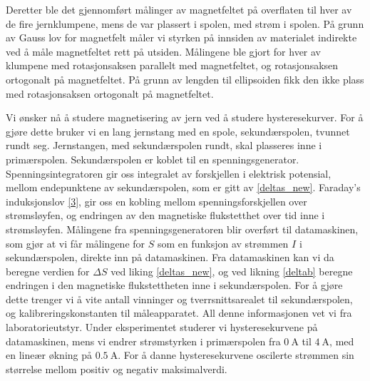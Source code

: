 \documentclass[%
 reprint,
 amsmath,amssymb,
 aps,
 norsk,
]{revtex4-1}
\begin{document}
Deretter ble det gjennomført målinger av magnetfeltet på overflaten til hver av de fire jernklumpene, mens de var plassert i spolen, med strøm i spolen. På grunn av Gauss lov for magnetfelt måler vi styrken på innsiden av materialet indirekte ved å måle magnetfeltet rett på utsiden. Målingene ble gjort for hver av klumpene med rotasjonsaksen parallelt med magnetfeltet, og rotasjonsaksen ortogonalt på magnetfeltet. På grunn av lengden til ellipsoiden fikk den ikke plass med rotasjonsaksen ortogonalt på magnetfeltet.
\par
Vi ønsker nå å studere magnetisering av jern ved å studere hysteresekurver. For å gjøre dette bruker vi en lang jernstang med en spole, sekundærspolen, tvunnet rundt seg. Jernstangen, med sekundærspolen rundt, skal plasseres inne i primærspolen. Sekundærspolen er koblet til en spenningsgenerator. Spenningsintegratoren gir oss integralet av forskjellen i elektrisk potensial, mellom endepunktene av sekundærspolen, som er gitt av \eqref{deltas_new}. Faraday's induksjonslov \eqref{3}, gir oss en kobling mellom spenningsforskjellen over strømsløyfen, og endringen av den magnetiske flukstetthet over tid inne i strømsløyfen. Målingene fra spenningsgeneratoren blir overført til datamaskinen, som gjør at vi får målingene for $S$ som en funksjon av strømmen $I$ i sekundærspolen, direkte inn på datamaskinen. Fra datamaskinen kan vi da beregne verdien for $\Delta S$ ved liking \eqref{deltas_new}, og ved likning \eqref{deltab} beregne endringen i den magnetiske flukstettheten inne i sekundærspolen. For å gjøre dette trenger vi å vite antall vinninger og tverrsnittsarealet til sekundærspolen, og kalibreringskonstanten til måleapparatet. All denne informasjonen vet vi fra laboratorieutstyr. Under eksperimentet studerer vi hysteresekurvene på datamaskinen, mens vi endrer strømstyrken i primærspolen fra $\SI{0}{\ampere}$ til $\SI{4}{\ampere}$, med en lineær økning på $\SI{0.5}{\ampere}$. For å danne hysteresekurvene oscilerte strømmen sin størrelse mellom positiv og negativ maksimalverdi.
\end{document}
